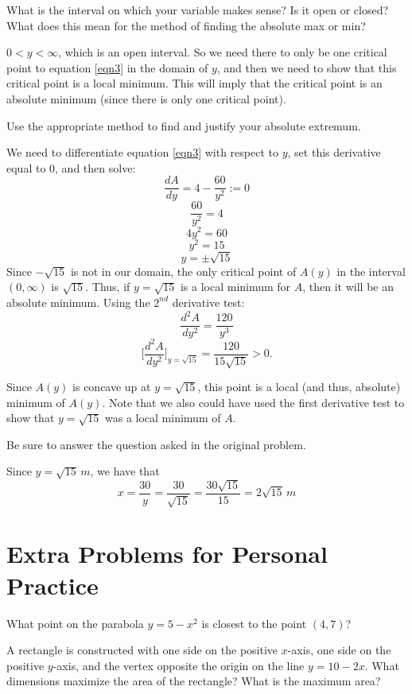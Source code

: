\documentclass[handout,nooutcomes]{ximera}
\renewenvironment{freeResponse}{
\ifhandout\setbox0\vbox\bgroup\else
\begin{trivlist}\item[\hskip \labelsep\bfseries Solution:\hspace{2ex}]
\fi}
{\ifhandout\egroup\else
\end{trivlist}
\fi}
\newcommand{\dd}[2][]{\frac{d #1}{d #2}}
\newcommand{\eval}[1]{\bigg[ #1 \bigg]}
\begin{document}
\begin{problem}
\begin{enumerate}
    \item  What is the interval on which your variable makes sense?
      Is it open or closed?
      What does this mean for the method of finding the absolute max or min?
      \begin{freeResponse}
        $0 < y < \infty$, which is an open interval.
        So we need there to only be one critical point to equation \eqref{eqn3} in the domain of $y$, and then we need to show that this critical point is a local minimum.
        This will imply that the critical point is an absolute minimum (since there is only one critical point).  
      \end{freeResponse}
		
    \item  Use the appropriate method to find and justify your absolute extremum.
      \begin{freeResponse}
        We need to differentiate equation \eqref{eqn3} with respect to $y$, set this derivative equal to $0$, and then solve:
        $$ \dd[A]{y} = 4 - \frac{60}{y^2} :=0 $$
        $$ \frac{60}{y^2} = 4 $$
        $$ 4y^2 = 60 $$
        $$ y^2 = 15 $$
        $$ y = \pm \sqrt{15} $$
        Since $-\sqrt{15}$ is not in our domain, the only critical point of $A(y)$ in the interval $(0,\infty)$ is $\sqrt{15}$.  
        Thus, if $y=\sqrt{15}$ is a local minimum for $A$, then it will be an absolute minimum.  
        Using the $2^{nd}$ derivative test:
        $$ \dd[^2A]{y^2} = \frac{120}{y^3} $$
        $$ \eval{\dd[^2A]{y^2}}_{y=\sqrt{15}} = \frac{120}{15 \sqrt{15}} > 0. $$
        
        Since $A(y)$ is concave up at $y=\sqrt{15}$, this point is a local (and thus, absolute) minimum of $A(y)$.  
        Note that we also could have used the first derivative test to show that $y=\sqrt{15}$ was a local minimum of $A$.
      \end{freeResponse}
      
    \item  Be sure to answer the question asked in the original problem.
      \begin{freeResponse}
        Since $y=\sqrt{15} \, m$, we have that
        $$ x = \frac{30}{y} = \frac{30}{\sqrt{15}} = \frac{30 \sqrt{15}}{15} = 2 \sqrt{15} \, m $$
      \end{freeResponse}
    \end{enumerate}
\end{problem}

\section{Extra Problems for Personal Practice}
\begin{problem}
What point on the parabola $y=5-x^2$ is closest to the point $(4,7)$?  
\end{problem}

\begin{problem}
  A rectangle is constructed with one side on the positive $x$-axis, one side on the positive $y$-axis, and the vertex opposite the origin on the line $y=10-2x$.
  What dimensions maximize the area of the rectangle?
  What is the maximum area?
\end{problem}
\end{document}
